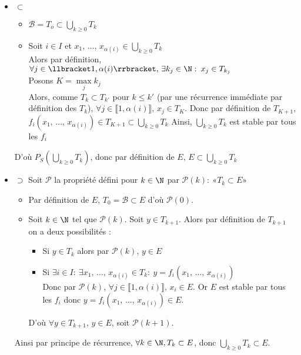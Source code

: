 \begin{itemize}[label=$\star$]
	\item $\boxed{\subset}$ 
		\begin{itemize}[label=$\bullet$]
			\item $\mathcal B = T_o \subset \bigcup\limits_{k \geq 0} T_k$
			\item Soit $i \in I$ et $x_1, \, \dots, \, x_{\alpha(i)} \in \bigcup\limits_{k \geq 0} T_k$\\
			Alors par définition, $\forall j \in \llbracket 1, \alpha(i) \rrbracket , \, \exists k_j \in \N : \: x_j \in T_{k_j}$\\
			Posons $K = \max\limits_j k_j$\\
			Alors, comme $T_k \subset T_{k'}$ pour $k \leq k'$ (par une récurrence immédiate par définition des $T_k$), $\forall j \in \llbracket 1, \alpha(i) \rrbracket, \, x_j \in T_K $. Donc par définition de $T_{K+1}$, $f_i(x_1, \, \dots, \, x_{\alpha(i)}) \in T_{K+1} \subset  \bigcup\limits_{k \geq 0} T_k$
			Ainsi, $\bigcup\limits_{k \geq 0} T_k$ est stable par tous les $f_i$
		\end{itemize}

	D'où $P_S\left( \bigcup\limits_{k \geq 0} T_k\right)$, donc par définition de $E$, $E \subset \bigcup\limits_{k \geq 0} T_k$
	
	
	\item $\boxed{\supset}$ Soit $\mathcal P$ la propriété défini pour $k \in \N$ par $\mathcal P(k): \: « T_k \subset E »$
	\begin{itemize}[label=$\bullet$]
		\item Par définition de $E$, $T_0 = \mathcal B \subset E$ d'où $\mathcal P(0)$.
		\item Soit $k \in \N$ tel que $\mathcal P(k)$. Soit $y \in T_{k+1}$. Alors par définition de $T_{k+1}$ on a deux possibilités :
		\begin{itemize}
			\item Si $y \in T_k$ alors par $\mathcal P(k)$, $y \in E$
			\item Si $\exists i \in I :\: \exists x_1, \, \dots, \, x_{\alpha(i)} \in T_k : \: y = f_i\left(x_1, \,\dots, \, x_{\alpha(i)}\right) $\\
			Donc par $\mathcal P (k)$, $\forall j \in \llbracket 1, \alpha(i) \rrbracket,\, x_i \in E$. Or $E$ est stable par tous les $f_i$ donc $y = f_i\left(x_1, \,\dots, \, x_{\alpha(i)}\right) \in E$.
		\end{itemize}
		D'où $\forall y \in T_{k+1}, \, y\in E$, soit $\mathcal P(k+1)$.
	\end{itemize}
	Ainsi par principe de récurrence, $\forall k \in \N, T_k \subset E$, donc $ \bigcup\limits_{k \geq 0} T_k \subset E$.
\end{itemize}

